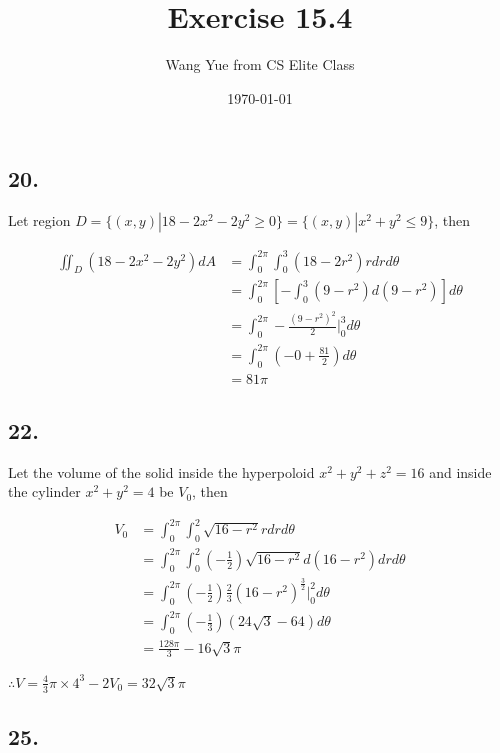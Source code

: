 \documentclass{article}
\begin{document}
  \title{Exercise 15.4}
  \author{Wang Yue from CS Elite Class}
  \date{\today}
  \maketitle

  \subsection*{20. }

  Let region $D = \{ (x, y) | 18 - 2x^2-2y^2 \geq 0\} = \{ (x, y) | x^2 + y^2 \leq 9 \}$, then

  $$\begin{aligned}
    \iint_D (18-2x^2-2y^2) dA &= \int_0^{2\pi} \int_0^3 (18-2r^2) r dr d\theta \\
    &= \int_0^{2\pi} [-\int_0^3 (9-r^2) d(9-r^2)] d\theta \\
    &= \int_0^{2\pi} -\frac{(9-r^2)^2}{2}\biggl|_0^3 d\theta \\
    &= \int_0^{2\pi} (-0 + \frac{81}{2}) d\theta \\
    &= 81\pi
  \end{aligned}$$
  
  \subsection*{22. }

  Let the volume of the solid inside the hyperpoloid $x^2+y^2+z^2=16$ and inside the cylinder $x^2+y^2=4$ be $V_0$, then

  $$\begin{aligned}
    V_0 &= \int_0^{2\pi} \int_0^2 \sqrt{16-r^2} r dr d\theta \\
    &= \int_0^{2\pi} \int_0^2 (-\frac 1 2) \sqrt{16-r^2} d(16-r^2) dr d\theta \\
    &= \int_0^{2\pi} (-\frac 1 2) \frac 2 3 (16-r^2)^{\frac 3 2}\biggl|_0^2 d\theta \\
    &= \int_0^{2\pi} (-\frac 1 3)(24\sqrt 3 -64) d\theta \\
    &= \frac{128\pi}{3} - 16\sqrt 3 \pi
  \end{aligned}$$

  $\therefore V = \frac 4 3 \pi \times 4^3 - 2V_0 = 32\sqrt 3 \pi$

  \subsection*{25. }
\end{document}
